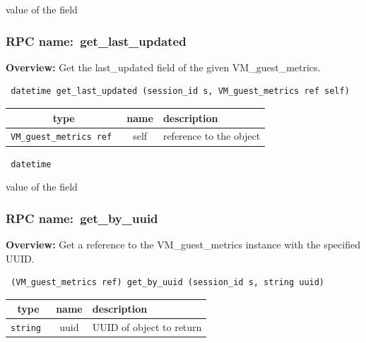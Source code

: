 value of the field
\vspace{0.3cm}
\vspace{0.3cm}
\vspace{0.3cm}
\subsubsection{RPC name:~get\_last\_updated}

{\bf Overview:} 
Get the last\_updated field of the given VM\_guest\_metrics.

\begin{verbatim} datetime get_last_updated (session_id s, VM_guest_metrics ref self)\end{verbatim}



 
\vspace{0.3cm}
\begin{tabular}{|c|c|p{7cm}|}
 \hline
{\bf type} & {\bf name} & {\bf description} \\ \hline
{\tt VM\_guest\_metrics ref } & self & reference to the object \\ \hline 

\end{tabular}

\vspace{0.3cm}

{\tt 
datetime
}


value of the field
\vspace{0.3cm}
\vspace{0.3cm}
\vspace{0.3cm}
\subsubsection{RPC name:~get\_by\_uuid}

{\bf Overview:} 
Get a reference to the VM\_guest\_metrics instance with the specified UUID.

\begin{verbatim} (VM_guest_metrics ref) get_by_uuid (session_id s, string uuid)\end{verbatim}



 
\vspace{0.3cm}
\begin{tabular}{|c|c|p{7cm}|}
 \hline
{\bf type} & {\bf name} & {\bf description} \\ \hline
{\tt string } & uuid & UUID of object to return \\ \hline 

\end{tabular}


